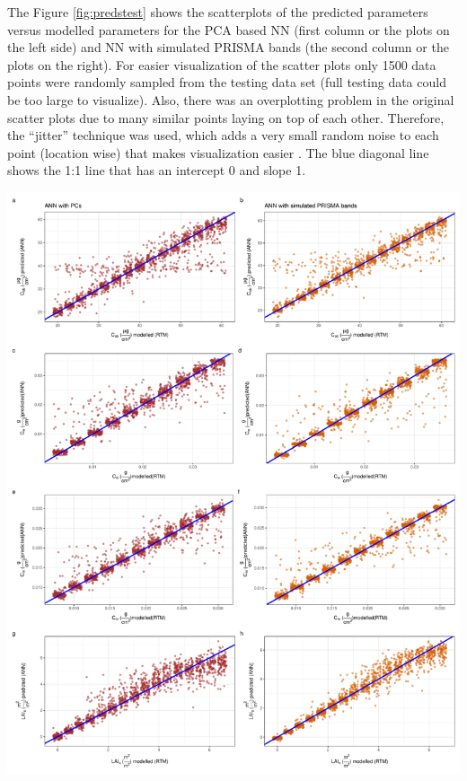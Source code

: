 \documentclass[a4paper, twoside]{templates/ociamthesis}
\let\origfigure\figure
\let\endorigfigure\endfigure
\renewenvironment{figure}[1][2] {
    \expandafter\origfigure\expandafter[H]
} {
    \endorigfigure
}
\begin{document}
The Figure \ref{fig:predstest} shows the scatterplots of the predicted parameters versus modelled parameters for the PCA based NN (first column or the plots on the left side) and NN with simulated PRISMA bands (the second column or the plots on the right). For easier visualization of the scatter plots only 1500 data points were randomly sampled from the testing data set (full testing data could be too large to visualize). Also, there was an overplotting problem in the original scatter plots due to many similar points laying on top of each other. Therefore, the ``jitter'' technique was used, which adds a very small random noise to each point (location wise) that makes visualization easier \citep{wickham2016r, ggplot2}. The blue diagonal line shows the 1:1 line that has an intercept 0 and slope 1.

\newpage

\begin{figure}
\includegraphics[width=1\linewidth]{./figures/preds_test} \caption{Predicted versus modelled RTM parameters for the PCA based NN (1st column) and NN with simulated PRISMA bands (2nd column)}\label{fig:predstest}
\end{figure}
\end{document}
